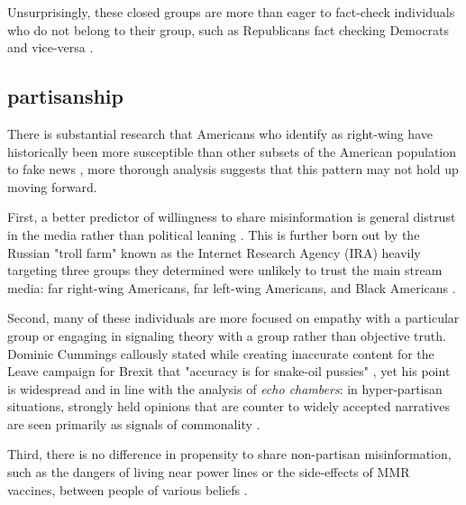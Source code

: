  Unsurprisingly, these closed groups are more than eager to fact-check individuals who do not belong to their group, such as Republicans fact checking Democrats and vice-versa \citep{shin2017partisan,iyengar2015fear}.

\subsection{partisanship} 
There is substantial research that Americans who identify as right-wing have historically been more susceptible than other subsets of the American population to fake news \citep{guess2019less,benkler2018network,grinberg2019fake,allcott2017social,badawy2018analyzing}, more thorough analysis suggests that this pattern may not hold up moving forward.

First, a better predictor of willingness to share misinformation is general distrust in the media rather than political leaning \citep{hopp2020people,shin2017partisan,kahan2012ideology,lewandowsky2016motivated,swire2017processing,mourao2019fake}. This is further born out by the Russian "troll farm" known as the Internet Research Agency (IRA) heavily targeting three groups they determined were unlikely to trust the main stream media: far right-wing Americans, far left-wing Americans, and Black Americans \citep{diresta2019tactics,howard2019ira,boatwright2018troll,jamieson2020cyberwar}. 

Second, many of these individuals are more focused on empathy with a particular group \citep{rheault2016measuring,dale2017nlp} or engaging in signaling theory with a group \citep{connelly2011signaling,lampe2007familiar,spence2002signaling} rather than objective truth. Dominic Cummings callously stated while creating inaccurate content for the Leave campaign for Brexit that "accuracy is for snake-oil pussies" \citep{crace2016accuracy}, yet his point is widespread and in line with the analysis of \textit{echo chambers}: in hyper-partisan situations, strongly held opinions that are counter to widely accepted narratives are seen primarily as signals of commonality \citep{yla2018populist,noppari2019user,lazer2018science,yla2019politicization,wasilewski2019us}. 

Third, there is no difference in propensity to share non-partisan misinformation, such as the dangers of living near power lines or the side-effects of MMR vaccines, between people of various beliefs \citep{kahan2015climate,hara2016co}.


